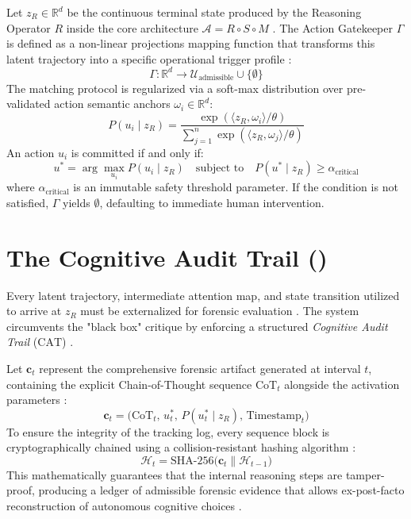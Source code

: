Let $z_R \in \mathbb{R}^d$ be the continuous terminal state produced by the Reasoning Operator $R$ inside the core architecture $\mathcal{A} = R \circ S \circ M$ \cite{Realignment:TripleOperators}. The Action Gatekeeper $\Gamma$ is defined as a non-linear projections mapping function that transforms this latent trajectory into a specific operational trigger profile \cite{Realignment:TripleOperators}:
\begin{equation}
    \Gamma: \mathbb{R}^d \longrightarrow \mathcal{U}_{\text{admissible}} \cup \{\emptyset\}
\end{equation}
The matching protocol is regularized via a soft-max distribution over pre-validated action semantic anchors $\omega_i \in \mathbb{R}^d$:
\begin{equation}
    P(u_i \mid z_R) = \frac{\exp(\langle z_R, \omega_i \rangle / \theta)}{\sum_{j=1}^{n} \exp(\langle z_R, \omega_j \rangle / \theta)}
\end{equation}
An action $u_i$ is committed if and only if:
\begin{equation}
    u^* = \arg\max_{u_i} P(u_i \mid z_R) \quad \text{subject to} \quad P(u^* \mid z_R) \ge \alpha_{\text{critical}}
\end{equation}
where $\alpha_{\text{critical}}$ is an immutable safety threshold parameter. If the condition is not satisfied, $\Gamma$ yields $\emptyset$, defaulting to immediate human intervention.

\section{\texorpdfstring{The Cognitive Audit Trail ()}{The Cognitive Audit Trail (CAT)}}
Every latent trajectory, intermediate attention map, and state transition utilized to arrive at $z_R$ must be externalized for forensic evaluation \cite{Manifesto:IncidentResponse}. The system circumvents the "black box" critique by enforcing a structured \textit{Cognitive Audit Trail} ($\text{CAT}$) \cite{Manifesto:IncidentResponse}.

Let $\mathbf{c}_t$ represent the comprehensive forensic artifact generated at interval $t$, containing the explicit Chain-of-Thought sequence $\text{CoT}_t$ alongside the activation parameters \cite{Manifesto:IncidentResponse}:
\begin{equation}
    \mathbf{c}_t = \Big( \text{CoT}_t, \, u^*_t, \, P(u^*_t \mid z_R), \, \text{Timestamp}_t \Big)
\end{equation}
To ensure the integrity of the tracking log, every sequence block is cryptographically chained using a collision-resistant hashing algorithm \cite{Manifesto:IncidentResponse}:
\begin{equation}
    \mathcal{H}_t = \text{SHA-256}\Big(\mathbf{c}_t \parallel \mathcal{H}_{t-1}\Big)
\end{equation}
This mathematically guarantees that the internal reasoning steps are tamper-proof, producing a ledger of admissible forensic evidence that allows ex-post-facto reconstruction of autonomous cognitive choices \cite{Manifesto:IncidentResponse}.

